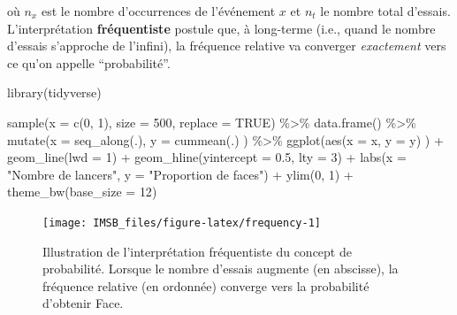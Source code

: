 \documentclass[
  a4paper,11pt,twoside,onecolumn,openright,final,oldfontcommands]{memoir}
\newenvironment{Shaded}{\begin{snugshade}}{\end{snugshade}}
\newcommand{\AttributeTok}[1]{\textcolor[rgb]{0.77,0.63,0.00}{#1}}
\newcommand{\ConstantTok}[1]{\textcolor[rgb]{0.00,0.00,0.00}{#1}}
\newcommand{\DecValTok}[1]{\textcolor[rgb]{0.00,0.00,0.81}{#1}}
\newcommand{\FloatTok}[1]{\textcolor[rgb]{0.00,0.00,0.81}{#1}}
\newcommand{\FunctionTok}[1]{\textcolor[rgb]{0.00,0.00,0.00}{#1}}
\newcommand{\NormalTok}[1]{#1}
\newcommand{\SpecialCharTok}[1]{\textcolor[rgb]{0.00,0.00,0.00}{#1}}
\newcommand{\StringTok}[1]{\textcolor[rgb]{0.31,0.60,0.02}{#1}}
\theoremstyle{definition}
\theoremstyle{definition}
\theoremstyle{definition}
\theoremstyle{definition}
\theoremstyle{remark}
\begin{document}
où \(n_{x}\) est le nombre d'occurrences de l'événement \(x\) et \(n_{t}\) le nombre total d'essais. L'interprétation \textbf{fréquentiste} postule que, à long-terme (i.e., quand le nombre d'essais s'approche de l'infini), la fréquence relative va converger \emph{exactement} vers ce qu'on appelle ``probabilité''.

\begin{Shaded}
\begin{Highlighting}[]
\FunctionTok{library}\NormalTok{(tidyverse)}

\FunctionTok{sample}\NormalTok{(}\AttributeTok{x =} \FunctionTok{c}\NormalTok{(}\DecValTok{0}\NormalTok{, }\DecValTok{1}\NormalTok{), }\AttributeTok{size =} \DecValTok{500}\NormalTok{, }\AttributeTok{replace =} \ConstantTok{TRUE}\NormalTok{) }\SpecialCharTok{\%\textgreater{}\%}
        \FunctionTok{data.frame}\NormalTok{() }\SpecialCharTok{\%\textgreater{}\%}
        \FunctionTok{mutate}\NormalTok{(}\AttributeTok{x =} \FunctionTok{seq\_along}\NormalTok{(.), }\AttributeTok{y =} \FunctionTok{cummean}\NormalTok{(.) ) }\SpecialCharTok{\%\textgreater{}\%}
        \FunctionTok{ggplot}\NormalTok{(}\FunctionTok{aes}\NormalTok{(}\AttributeTok{x =}\NormalTok{ x, }\AttributeTok{y =}\NormalTok{ y) ) }\SpecialCharTok{+}
        \FunctionTok{geom\_line}\NormalTok{(}\AttributeTok{lwd =} \DecValTok{1}\NormalTok{) }\SpecialCharTok{+}
        \FunctionTok{geom\_hline}\NormalTok{(}\AttributeTok{yintercept =} \FloatTok{0.5}\NormalTok{, }\AttributeTok{lty =} \DecValTok{3}\NormalTok{) }\SpecialCharTok{+}
        \FunctionTok{labs}\NormalTok{(}\AttributeTok{x =} \StringTok{"Nombre de lancers"}\NormalTok{, }\AttributeTok{y =} \StringTok{"Proportion de faces"}\NormalTok{) }\SpecialCharTok{+}
        \FunctionTok{ylim}\NormalTok{(}\DecValTok{0}\NormalTok{, }\DecValTok{1}\NormalTok{) }\SpecialCharTok{+}
        \FunctionTok{theme\_bw}\NormalTok{(}\AttributeTok{base\_size =} \DecValTok{12}\NormalTok{)}
\end{Highlighting}
\end{Shaded}

\begin{figure}[!htb]

{\centering \texttt{[image: IMSB\_files/figure-latex/frequency-1]} 

}

\caption{Illustration de l'interprétation fréquentiste du concept de probabilité. Lorsque le nombre d'essais augmente (en abscisse), la fréquence relative (en ordonnée) converge vers la probabilité d'obtenir Face.}\label{fig:frequency}
\end{figure}
\end{document}
